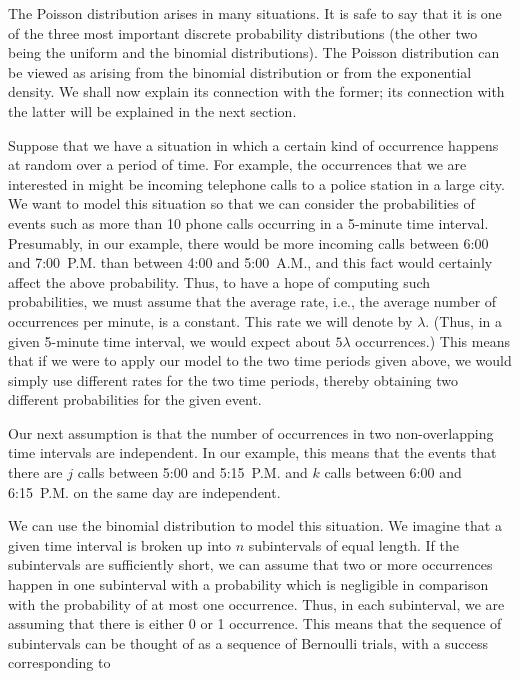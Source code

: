 The Poisson distribution arises in many situations.  It is safe to say that it is one
of the three most important discrete probability distributions (the other two being
the uniform and the binomial distributions).  The Poisson distribution can be viewed
as arising from the binomial distribution or from the exponential density.  We shall
now explain its connection with the former; its connection with the latter will be
explained in the next section.
\par Suppose that we have a situation in which a certain kind of occurrence happens at
random over a period of time.  For example, the occurrences that we are interested in
might be incoming telephone calls to a police station in a large city.  We want to
model this situation so that we can consider the probabilities of events such as more
than 10 phone calls occurring in a 5-minute time interval.  Presumably, in our
example, there would be more incoming calls between 6:00 and 7:00~{\footnotesize P.M.} than
between 4:00 and 5:00~{\footnotesize A.M.}, and this fact would certainly affect the above
probability.  Thus, to have a hope of computing such probabilities, we must assume that the
average rate, i.e.,  the average number of occurrences per minute, is a constant.  This rate we
will denote by
$\lambda$.  (Thus, in a given 5-minute time interval, we would expect about
$5\lambda$ occurrences.)  This means that if we were to apply our model to the two
time periods given above, we would simply use different rates for the two time
periods, thereby obtaining two different probabilities for the given event.  
\par Our next assumption is that the number of occurrences in two
non-overlapping time intervals are independent.  In our example, this
means that the events that there are $j$ calls between 5:00 and 5:15~{\footnotesize P.M.} and $k$
calls between 6:00 and 6:15~{\footnotesize P.M.} on the same day are independent.
\par We can use the binomial distribution to model this situation.  We imagine that a
given time interval is broken up into $n$ subintervals of equal length.  If the
subintervals are sufficiently short, we can assume that two or more occurrences happen
in one subinterval with a probability which is negligible in comparison with the
probability of at most one occurrence.  Thus, in each subinterval, we are assuming
that there is either 0 or 1 occurrence.  This means that the sequence of subintervals
can be thought of as a sequence of Bernoulli trials, with a success corresponding to
